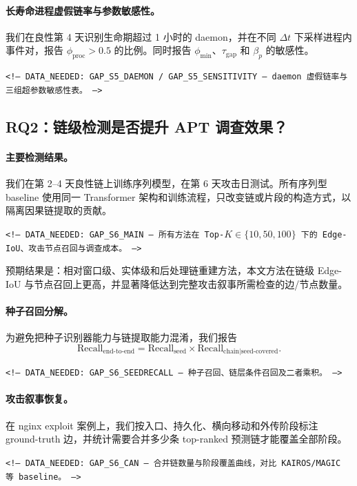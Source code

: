 \paragraph{长寿命进程虚假链率与参数敏感性。}我们在良性第 4 天识别生命期超过 1 小时的 daemon，并在不同 $\Delta t$ 下采样进程内事件对，报告 $\phi_{\text{proc}}>0.5$ 的比例。同时报告 $\phi_{\min}$、$\tau_{\text{gap}}$ 和 $\beta_p$ 的敏感性。
\begin{flushleft}\small\texttt{<!-- DATA\_NEEDED: GAP\_S5\_DAEMON / GAP\_S5\_SENSITIVITY --- daemon 虚假链率与三组超参数敏感性表。 -->}\end{flushleft}

\subsection{RQ2：链级检测是否提升 APT 调查效果？}

\paragraph{主要检测结果。}我们在第 2--4 天良性链上训练序列模型，在第 6 天攻击日测试。所有序列型 baseline 使用同一 Transformer 架构和训练流程，只改变链或片段的构造方式，以隔离因果链提取的贡献。
\begin{flushleft}\small\texttt{<!-- DATA\_NEEDED: GAP\_S6\_MAIN --- 所有方法在 Top-$K\in\{10,50,100\}$ 下的 Edge-IoU、攻击节点召回与调查成本。 -->}\end{flushleft}
预期结果是：相对窗口级、实体级和后处理链重建方法，本文方法在链级 Edge-IoU 与节点召回上更高，并显著降低达到完整攻击叙事所需检查的边/节点数量。

\paragraph{种子召回分解。}为避免把种子识别器能力与链提取能力混淆，我们报告
\[
\mathrm{Recall}_{\text{end-to-end}} = \mathrm{Recall}_{\text{seed}} \times \mathrm{Recall}_{\text{chain}\mid\text{seed-covered}}.
\]
\begin{flushleft}\small\texttt{<!-- DATA\_NEEDED: GAP\_S6\_SEEDRECALL --- 种子召回、链层条件召回及二者乘积。 -->}\end{flushleft}

\paragraph{攻击叙事恢复。}在 nginx exploit 案例上，我们按入口、持久化、横向移动和外传阶段标注 ground-truth 边，并统计需要合并多少条 top-ranked 预测链才能覆盖全部阶段。
\begin{flushleft}\small\texttt{<!-- DATA\_NEEDED: GAP\_S6\_CAN --- 合并链数量与阶段覆盖曲线，对比 KAIROS/MAGIC 等 baseline。 -->}\end{flushleft}

